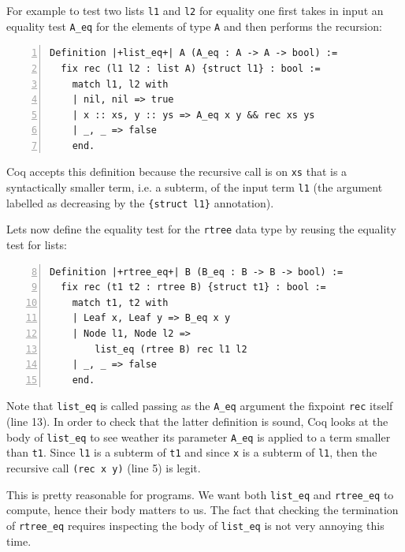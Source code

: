 \documentclass[sigplan,10pt,review]{acmart}\settopmatter{printfolios=true,printccs=false,printacmref=false}
\begin{document}
For example to test two lists \lstinline+l1+ and \lstinline+l2+ for
equality one first takes in input an equality test \lstinline+A_eq+
for the elements of type \lstinline+A+ and then performs the
recursion:

\begin{minipage}{\textwidth}\begin{lstlisting}[numbers=left]
Definition |+list_eq+| A (A_eq : A -> A -> bool) :=
  fix rec (l1 l2 : list A) {struct l1} : bool :=
    match l1, l2 with
    | nil, nil => true
    | x :: xs, y :: ys => A_eq x y && rec xs ys
    | _, _ => false
    end.
\end{lstlisting}\end{minipage}

\noindent
Coq accepts this definition because
the recursive call is on \lstinline+xs+ that is a syntactically
smaller term, i.e. a subterm, of the input term \lstinline+l1+ (the
argument labelled as decreasing by the \lstinline+{struct l1}+
annotation).

Lets now define the equality test for the \lstinline+rtree+ data type
by reusing the equality test for lists:

\begin{minipage}{\textwidth}\begin{lstlisting}[numbers=left,firstnumber=8]
Definition |+rtree_eq+| B (B_eq : B -> B -> bool) :=
  fix rec (t1 t2 : rtree B) {struct t1} : bool :=
    match t1, t2 with
    | Leaf x, Leaf y => B_eq x y
    | Node l1, Node l2 =>
        list_eq (rtree B) rec l1 l2
    | _, _ => false
    end.
\end{lstlisting}\end{minipage}

\noindent
Note that \lstinline+list_eq+ is called passing as the \lstinline+A_eq+
argument the fixpoint \lstinline+rec+ itself (line 13). In order to
check that the latter definition is sound, Coq looks at the body of
\lstinline+list_eq+ to see weather its parameter \lstinline+A_eq+ is
applied to a term smaller than \lstinline+t1+. Since
\lstinline+l1+ is a subterm of \lstinline+t1+ and since \lstinline+x+
is a subterm of \lstinline+l1+, then the recursive call
\lstinline+(rec x y)+ (line 5) is legit.

This is pretty reasonable for programs. We want both \lstinline+list_eq+
and \lstinline+rtree_eq+ to compute, hence their body matters to us.
The fact that checking the termination of \lstinline+rtree_eq+ requires
inspecting the body of \lstinline+list_eq+ is not very annoying this
time.
\end{document}
